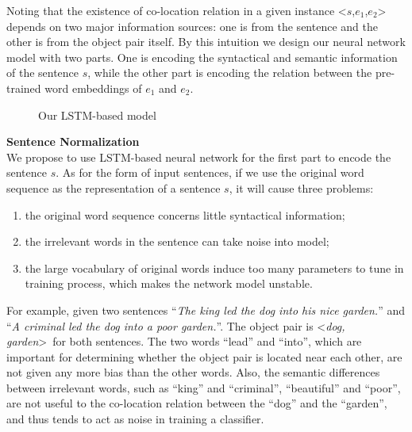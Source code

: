Noting that the existence of co-location relation in 
a given instance \textless $s$,$e_1$,$e_2$\textgreater~ depends 
on two major information sources: one is from the sentence 
and the other is from the object pair itself.
By this intuition we design our neural network model with two parts.
One is encoding the syntactical and semantic information of the sentence $s$, while the other part is encoding the relation between the pre-trained word embeddings of $e_1$ and $e_2$.


\begin{figure*}[th]
	\centering
	\caption{Our LSTM-based model}
	\label{fig:LSTM}
\end{figure*}

\noindent 
\textbf{Sentence Normalization}\\
We propose to use LSTM-based neural network for the first part to encode the sentence $s$.
As for the form of input sentences, 
if we use the original word sequence as the representation of a sentence $s$,  
it will cause three problems:
\begin{enumerate} 
\item the original word sequence concerns little syntactical information;
\item the irrelevant words in the sentence can take noise into model; 
\item the large vocabulary of original words induce too many parameters to tune in training process, which makes the network model unstable.
\end{enumerate}

For example, given two sentences 
``\textit{The king led the dog into his nice garden.}'' and 
``\textit{A criminal led the dog into a poor garden.}''. 
The object pair is \textless \textit{dog, garden}\textgreater~for 
both sentences. The two words ``lead'' and ``into'', which are important
for determining whether the object pair is located near each other, are 
not given any more bias than the other words. 
Also, the semantic differences between irrelevant words, such as ``king'' and ``criminal'', ``beautiful'' and ``poor'', are not useful to the co-location
relation between the ``dog'' and the ``garden'', and 
thus tends to act as noise in training a classifier.

